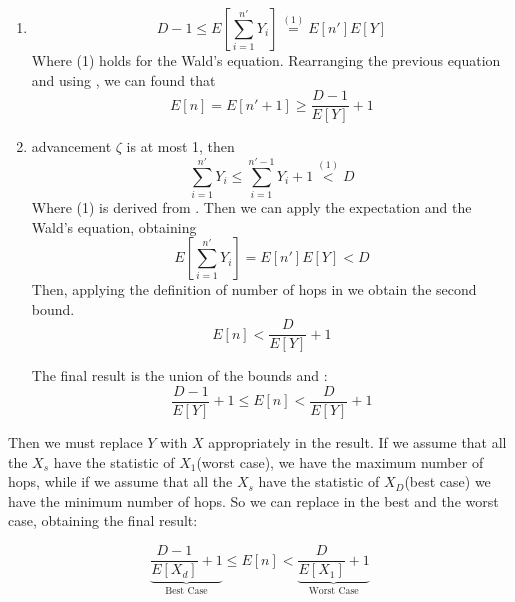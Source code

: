 \begin{enumerate}
		\item
			$$ D-1 \le E\left[\sum_{i=1}^{n'} Y_i\right] \stackrel{(1)}{=} E[n']E[Y] $$
			Where (1) holds for the Wald's equation. Rearranging the previous equation and using , we can found that
			\begin{equation}\label{lowerBound}
				E[n] = E[n'+1] \ge \frac{D-1}{E[Y]} +1
			\end{equation}
		\item
			advancement $\zeta$ is at most 1, then
			$$\sum_{i=1}^{n'} Y_i \le \sum_{i=1}^{n'-1} Y_i +1 \stackrel{(1)}{<} D$$
			Where (1) is derived from . Then we can apply the expectation and the Wald's equation, obtaining
			$$E\left[\sum_{i=1}^{n'} Y_i\right] = E[n']E[Y] < D$$
			Then, applying the definition of number of hops in  we obtain the second bound.
			\begin{equation}\label{upperBound}
				E[n] < \frac{D}{E[Y]} + 1
			\end{equation}

			The final result is the union of the bounds  and :
			\begin{equation}\label{iidBounds}
				\frac{D-1}{E[Y]} +1 \le E[n] < \frac{D}{E[Y]} + 1
			\end{equation}
\end{enumerate}
Then we must replace $Y$ with $X$ appropriately in the result.
If we assume that all the $X_s$ have the statistic of $X_1$(worst case), we have the maximum number of hops, while if we assume that all the $X_s$ have the statistic of $X_D$(best case) we have the minimum number of hops. So we can replace in  the best and the worst case, obtaining the final result:

\begin{equation}\label{finalBounds}
	\underbrace{\frac{D-1}{E[X_d]} +1}_\text{Best Case} \le E[n] < \underbrace{\frac{D}{E[X_1]} + 1}_\text{Worst Case}
\end{equation}
